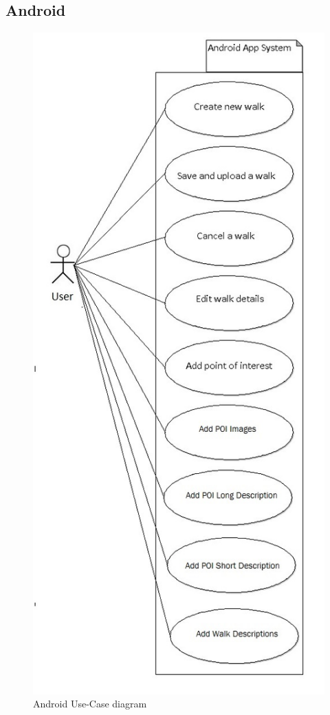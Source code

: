 \documentclass[12pt]{article}
\begin{document}
\subsection{Android}
\begin{figure}[htp]
\centering
\includegraphics[scale=0.50]{Project_Plan/docs/Android_use_case_final.jpg}
\caption{Android Use-Case diagram}
\label{Android Use-Case Diagram}
\end{figure}
\end{document}
